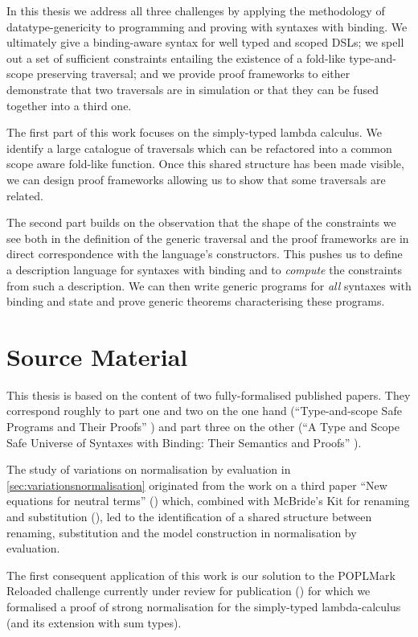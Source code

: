 In this thesis we address all three challenges by applying the methodology of
datatype-genericity to programming and proving with syntaxes with binding.
We ultimately give a binding-aware syntax for well typed and scoped DSLs; we
spell out a set of sufficient constraints entailing the existence of a fold-like
type-and-scope preserving traversal; and we provide proof frameworks
to either demonstrate that two traversals are in simulation or that they can be
fused together into a third one.

The first part of this work focuses on the simply-typed lambda calculus. We
identify a large catalogue of traversals which can be refactored into a common
scope aware fold-like function. Once this shared structure has been made
visible, we can design proof frameworks allowing us to show that some traversals
are related.

The second part builds on the observation that the shape of the constraints we
see both in the definition of the generic traversal and the proof frameworks
are in direct correspondence with the language's constructors. This pushes us
to define a description language for syntaxes with binding and to \emph{compute}
the constraints from such a description. We can then write generic programs for
\emph{all} syntaxes with binding and state and prove generic theorems characterising
these programs.

\section{Source Material}

This thesis is based on the content of two fully-formalised published papers. They
correspond roughly to part one and two on the one hand
(``Type-and-scope Safe Programs and Their Proofs'' \cite{allais2017type, repo2017})
and part three on the other
(``A Type and Scope Safe Universe of Syntaxes with Binding: Their Semantics and Proofs''
\cite{generic-syntax, repo2018}).

The study of variations on normalisation by evaluation in \cref{sec:variationsnormalisation}
originated from the work on a third paper ``New equations for neutral terms''
(\cite{new-equations}) which, combined with McBride's Kit for renaming and substitution
(\citeyear{mcbride2005type}), led to the identification of a shared structure between renaming,
substitution and the model construction in normalisation by evaluation.

The first consequent application of this work is our solution to the
POPLMark Reloaded challenge currently under review for publication
(\cite{poplmarkreloaded, poplmark2}) for which we formalised a proof of
strong normalisation for the simply-typed lambda-calculus (and its extension
with sum types).



